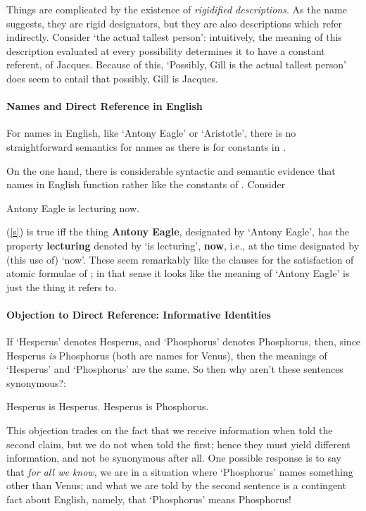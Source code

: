 Things are complicated by the existence of \emph{rigidified descriptions}. As the name suggests, they are rigid designators, but they are also descriptions which refer indirectly. Consider ‘the actual tallest person’: intuitively, the meaning of this description evaluated at every possibility determines it to have a constant referent, of Jacques. Because of this, ‘Possibly, Gill is the actual tallest person’ does seem to entail that possibly, Gill is Jacques. 
	


\paragraph{Names and Direct Reference in English}
For names in English, like `Antony Eagle' or `Aristotle', there is no straightforward semantics for names as there is for constants in \ltwo.

On the one hand, there is considerable syntactic and semantic evidence that names in English function rather like the constants of \ltwo. Consider \begin{exe}
	\ex Antony Eagle is lecturing now.\label{s}
\end{exe}  (\ref{s}) is true  iff the thing \textbf{Antony Eagle}, designated by `Antony Eagle', has the property \textbf{lecturing} denoted by `is lecturing', \textbf{now}, i.e., at the time designated by (this use of) `now'. These seem remarkably like the clauses for the satisfaction of atomic formulae of \ltwo; in that sense it looks like the meaning of `Antony Eagle' is just the thing it refers to.

\paragraph{Objection to Direct Reference: Informative Identities}
 If `Hesperus' denotes Hesperus, and `Phosphorus' denotes Phosphorus, then, since Hesperus \emph{is} Phosphorus (both are names for Venus), then the meanings of `Hesperus' and `Phosphorus' are the same. So then why aren't these sentences synonymous?: \begin{exe}
		\ex Hesperus is Hesperus.
		\ex Hesperus is Phosphorus.
	\end{exe}



This objection trades on the fact that we receive information when told the second claim, but we do not when told the first; hence they must yield different information, and not be synonymous after all. One possible response is to say that \emph{for all we know}, we are in a situation where `Phosphorus' names something other than Venus; and what we are told by the second sentence is a contingent fact about English, namely, that `Phosphorus' means Phosphorus!


